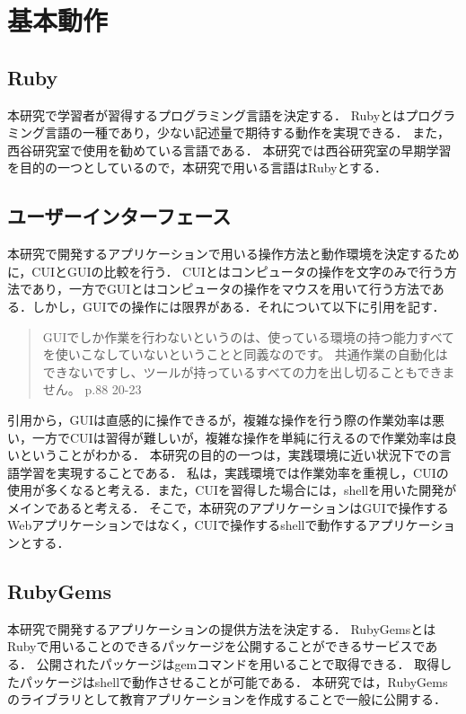 \chapter{基本動作}\label{basic}

\section{Ruby}\label{ruby}
本研究で学習者が習得するプログラミング言語を決定する．
Rubyとはプログラミング言語の一種であり，少ない記述量で期待する動作を実現できる．
また，西谷研究室で使用を勧めている言語である．
本研究では西谷研究室の早期学習を目的の一つとしているので，本研究で用いる言語はRubyとする．

\section{ユーザーインターフェース}\label{ui}
本研究で開発するアプリケーションで用いる操作方法と動作環境を決定するために，CUI\cite{cui}とGUI\cite{gui}の比較を行う．
CUIとはコンピュータの操作を文字のみで行う方法であり，一方でGUIとはコンピュータの操作をマウスを用いて行う方法である．しかし，GUIでの操作には限界がある．それについて以下に引用を記す．
\begin{quotation}
  GUIでしか作業を行わないというのは、使っている環境の持つ能力すべてを使いこなしていないということと同義なのです。
  共通作業の自動化はできないですし、ツールが持っているすべての力を出し切ることもできません。\cite{達人プログラマー} p.88 20-23
\end{quotation}
引用から，GUIは直感的に操作できるが，複雑な操作を行う際の作業効率は悪い，一方でCUIは習得が難しいが，複雑な操作を単純に行えるので作業効率は良いということがわかる．
本研究の目的の一つは，実践環境に近い状況下での言語学習を実現することである．
私は，実践環境では作業効率を重視し，CUIの使用が多くなると考える．また，CUIを習得した場合には，shellを用いた開発がメインであると考える．
そこで，本研究のアプリケーションはGUIで操作するWebアプリケーションではなく，CUIで操作するshellで動作するアプリケーションとする．

\section{RubyGems}\label{rubygems}
本研究で開発するアプリケーションの提供方法を決定する．
RubyGems\cite{RubyGems}とはRubyで用いることのできるパッケージを公開することができるサービスである．
公開されたパッケージはgemコマンドを用いることで取得できる．
取得したパッケージはshellで動作させることが可能である．
本研究では，RubyGemsのライブラリとして教育アプリケーションを作成することで一般に公開する．


